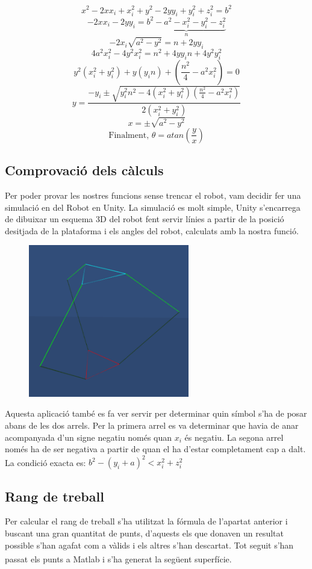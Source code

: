 \[x^2 - 2xx_i + x_i^2 + y^2 - 2yy_i + y_i^2 + z_i^2 = b^2\]
\[-2xx_i - 2yy_i = \underbrace{b^2 - a^2 - x_i^2 - y_i^2 - z_i^2}_{n}\]
\[-2x_i\sqrt{a^2-y^2}=n+2yy_i\]
\[4a^2x_i^2-4y^2x_i^2=n^2+4yy_in+4y^2y_i^2\]
\[y^2(x_i^2+y_i^2)+y(y_in)+(\frac{n^2}{4}-a^2x_i^2)=0\]
\[y=\frac{-y_i\pm\sqrt{y_i^2n^2-4(x_i^2+y_i^2)(\frac{n^2}{4}-a^2x_i^2)}}{2(x_i^2+y_i^2)}\]
\[x=\pm\sqrt{a^2-y^2}\]
\[\textrm{Finalment, }\theta=atan(\frac{y}{x})\]

\subsection{Comprovació dels càlculs}

Per poder provar les nostres funcions sense trencar el robot, vam decidir fer una simulació en del Robot en Unity. La simulació es molt simple, Unity s'encarrega de dibuixar un esquema 3D del robot fent servir línies a partir de la posició desitjada de la plataforma i els angles del robot, calculats amb la nostra funció.

\begin{figure}[h!]
\centering
\includegraphics[width=7cm]{./images/simulacioRobot}
\end{figure}

Aquesta aplicació també es fa ver servir per determinar quin símbol s'ha de posar abans de les dos arrels. Per la primera arrel es va determinar que havia de anar acompanyada d'un signe negatiu només quan \(x_i\) és negatiu. La segona arrel només ha de ser negativa a partir de quan el ha d'estar completament cap a dalt. La condició exacta es: \(b^2-(y_i+a)^2<x_i^2+z_i^2\) 

\newpage
\subsection{Rang de treball}

Per calcular el rang de treball s'ha utilitzat la fórmula de l'apartat anterior i buscant una gran quantitat de punts, d'aquests els que donaven un resultat possible s'han agafat com a vàlids i els altres s'han descartat. Tot seguit s'han passat els punts a Matlab\textsuperscript{\textregistered} i s'ha generat la següent superfície.

